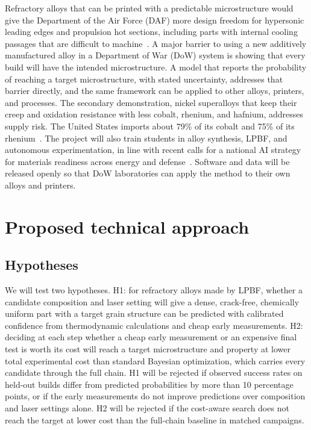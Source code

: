 \documentclass[12pt,letterpaper]{article}
\begin{document}
Refractory alloys that can be printed with a predictable microstructure would
give the Department of the Air Force (DAF) more design freedom for hypersonic
leading edges and propulsion hot sections, including parts with internal
cooling passages that are difficult to machine~\cite{peters2024}. A major
barrier to using a new additively manufactured alloy in a Department of War
(DoW) system is showing that every build will have the intended
microstructure. A model that reports the probability of reaching a target
microstructure, with stated uncertainty, addresses that barrier directly, and
the same framework can be applied to other alloys, printers, and processes.
The secondary demonstration, nickel superalloys that keep their creep and
oxidation resistance with less cobalt, rhenium, and hafnium, addresses supply
risk. The United States imports about 79\% of its cobalt and 75\% of its
rhenium~\cite{usgs2026}. The project will also train students in alloy
synthesis, LPBF, and autonomous experimentation, in line with recent calls for
a national AI strategy for materials readiness across energy and
defense~\cite{campo2026}. Software and data will be released openly so that
DoW laboratories can apply the method to their own alloys and printers.

\section{Proposed technical approach}

\subsection{Hypotheses}
We will test two hypotheses. H1: for refractory alloys made by LPBF, whether
a candidate composition and laser setting will give a dense, crack-free,
chemically uniform part with a target grain structure can be predicted with
calibrated confidence from thermodynamic calculations and cheap early
measurements. H2: deciding at
each step whether a cheap early measurement or an expensive final test is
worth its cost will reach a target microstructure and property at lower total
experimental cost than standard Bayesian optimization, which carries every
candidate through the full chain. H1 will be rejected if observed success
rates on held-out builds differ from predicted probabilities by more than
10 percentage points, or if the early measurements do not improve predictions
over composition and laser settings alone. H2 will be rejected if the
cost-aware search does not reach the target at lower cost than the full-chain
baseline in matched campaigns.
\end{document}
